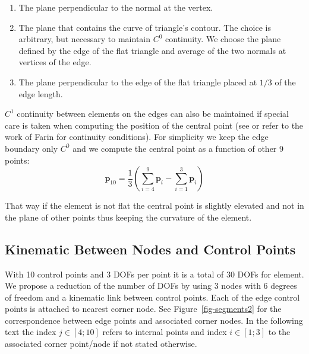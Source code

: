 \documentclass{egpubl}
\begin{document}
\begin{enumerate}
    \item The plane perpendicular to the normal at the vertex.
    \item The plane that contains the curve of triangle's contour. The
        choice is arbitrary, but necessary to maintain $C^0$ continuity. 
        We choose the plane defined by the edge of the flat triangle and
        average of the two normals at vertices of the edge. 
    \item The plane perpendicular to the edge of the flat triangle placed at
        $1/3$ of the edge length.
\end{enumerate}


$C^1$ continuity between elements on the edges can also be maintained if special care is taken
when computing the position of the central point
(see \cite{Ubach2010} or refer to the work of Farin \cite{Farin2002} for continuity conditions). 
For simplicity we keep the edge boundary only $C^0$ and we compute the central point as a function of other 9 points: 
%
\begin{equation}\label{eq-central}
    \mathbf{p}_{10} = \frac{1}{3}(\sum_{i=4}^9 \mathbf{p}_i - \sum_{i=1}^3 \mathbf{p}_i)
\end{equation}
%

That way if the element is not flat the central point is slightly elevated
and not in the plane of other points thus keeping the curvature of the
element.


\subsection{Kinematic Between Nodes and Control Points } %

With 10 control points and 3 DOFs per point it is a total of 30 DOFs for element.
We propose a reduction of the number of DOFs by using 3 nodes with 6 degrees of freedom
and a kinematic link between control points.
Each of the edge control points is attached to nearest corner node. See Figure~\ref{fig-segments2} for the correspondence between edge points and
associated corner nodes. 
In the following text the index $j \in [4;10]$ refers to internal points and index $i \in [1;3]$ to the associated corner point/node %
if not stated otherwise.
\end{document}
